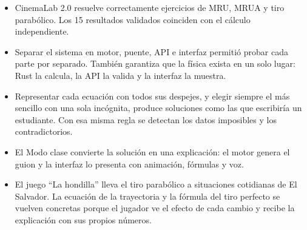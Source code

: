 \documentclass[11pt,letterpaper]{article}
\begin{document}
\begin{itemize}
  \item CinemaLab 2.0 resuelve correctamente ejercicios de MRU, MRUA y tiro parabólico. Los 15 resultados validados coinciden con el cálculo independiente.
  \item Separar el sistema en motor, puente, API e interfaz permitió probar cada parte por separado. También garantiza que la física exista en un solo lugar: Rust la calcula, la API la valida y la interfaz la muestra.
  \item Representar cada ecuación con todos sus despejes, y elegir siempre el más sencillo con una sola incógnita, produce soluciones como las que escribiría un estudiante. Con esa misma regla se detectan los datos imposibles y los contradictorios.
  \item El Modo clase convierte la solución en una explicación: el motor genera el guion y la interfaz lo presenta con animación, fórmulas y voz.
  \item El juego ``La hondilla'' lleva el tiro parabólico a situaciones cotidianas de El Salvador. La ecuación de la trayectoria y la fórmula del tiro perfecto se vuelven concretas porque el jugador ve el efecto de cada cambio y recibe la explicación con sus propios números.
\end{itemize}
\end{document}

